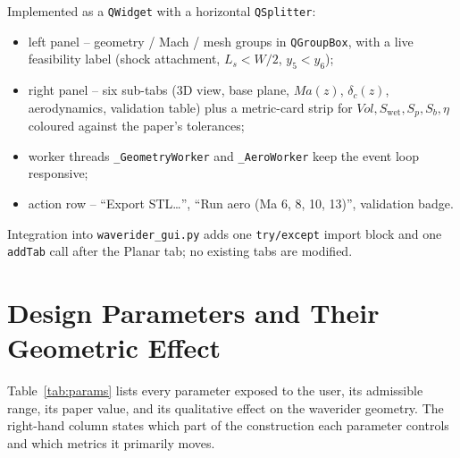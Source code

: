 \documentclass[11pt,a4paper]{article}
\newcommand{\Ma}{\mathit{Ma}}
\newcommand{\Vol}{\mathit{Vol}}
\newcommand{\Swet}{S_{\mathrm{wet}}}
\newcommand{\Sp}{S_{p}}
\newcommand{\Sb}{S_{b}}
\newcommand{\Ls}{L_{s}}
\newcommand{\dc}{\delta_{c}}
\begin{document}
Implemented as a \texttt{QWidget} with a horizontal \texttt{QSplitter}:
\begin{itemize}\setlength\itemsep{0pt}
\item left panel -- geometry / Mach / mesh groups in \texttt{QGroupBox},
      with a live feasibility label (shock attachment, $\Ls<W/2$,
      $y_{5}<y_{6}$);
\item right panel -- six sub-tabs (3D view, base plane, $\Ma(z)$,
      $\dc(z)$, aerodynamics, validation table) plus a metric-card
      strip for $\Vol, \Swet, \Sp, \Sb, \eta$ coloured against the
      paper's tolerances;
\item worker threads \texttt{\_GeometryWorker} and \texttt{\_AeroWorker}
      keep the event loop responsive;
\item action row -- ``Export STL\dots'', ``Run aero (Ma 6, 8, 10, 13)'',
      validation badge.
\end{itemize}
Integration into \texttt{waverider\_gui.py} adds one \texttt{try/except}
import block and one \texttt{addTab} call after the Planar tab; no
existing tabs are modified.

\section{Design Parameters and Their Geometric Effect}

Table~\ref{tab:params} lists every parameter exposed to the user,
its admissible range, its paper value, and its qualitative effect on
the waverider geometry. The right-hand column states which part of the
construction each parameter controls and which metrics it primarily
moves.
\end{document}
